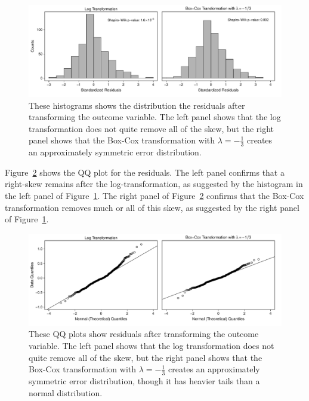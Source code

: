 \documentclass[12pt]{article}
\begin{document}
\begin{figure}[h!]
\begin{center}
\includegraphics[width = \textwidth]{figs/cg-trans-residuals-hist.pdf}
\caption{These histograms shows the distribution the residuals after transforming the outcome variable. 
The left panel shows that the log transformation does not quite remove all of the skew, but the right panel shows that the Box-Cox transformation with $\lambda = -\frac{1}{3}$ creates an approximately symmetric error distribution.}\label{fig:cg-trans-residuals-hist}
\end{center}
\end{figure}

Figure~\ref{fig:cg-trans-qq-plot} shows the QQ plot for the residuals. 
The left panel confirms that a right-skew remains after the log-transformation, as suggested by the histogram in the left panel of Figure~\ref{fig:cg-trans-residuals-hist}. 
The right panel of Figure~\ref{fig:cg-trans-qq-plot} confirms that the Box-Cox transformation removes much or all of this skew, as suggested by the right panel of Figure~\ref{fig:cg-trans-residuals-hist}. 

\begin{figure}[h!]
\begin{center}
\includegraphics[width = \textwidth]{figs/cg-trans-qq-plot.pdf}
\caption{These QQ plots show residuals after transforming the outcome variable.
The left panel shows that the log transformation does not quite remove all of the skew, but the right panel shows that the Box-Cox transformation with $\lambda = -\frac{1}{3}$ creates an approximately symmetric error distribution, though it has heavier tails than a normal distribution.}\label{fig:cg-trans-qq-plot}
\end{center}
\end{figure}
\end{document}
